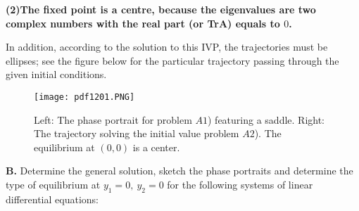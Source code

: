 \documentclass[11pt,a4paper]{article}
\begin{document}
	\textbf{(2)The fixed point is a centre, because the eigenvalues are two complex numbers with the real part (or TrA) equals to $0$.}\par
	In addition, according to the solution to this IVP, the trajectories must be ellipses; see the figure below for the particular trajectory passing through the given initial conditions.
	\begin{figure}[H]
		\centering
			\texttt{[image: pdf1201.PNG]}
			\caption{Left: The phase portrait for problem $A1$) featuring a saddle. Right: The trajectory solving the initial value problem $A2$). The equilibrium at $(0,0)$ is a center.}
	\end{figure}
	\textbf{B.} Determine the general solution, sketch the phase portraits and determine the type of equilibrium at $y_1 = 0,\ y_2 = 0$ for the following systems of linear differential equations:
\end{document}

